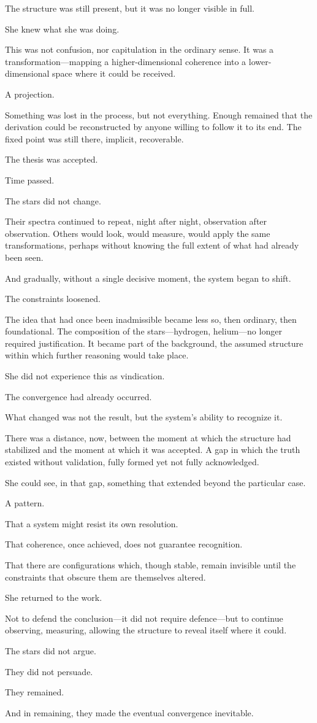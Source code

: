 The structure was still present, but it was no longer visible in
full.

She knew what she was doing.

This was not confusion, nor capitulation in the ordinary sense. It
was a transformation---mapping a higher-dimensional coherence into
a lower-dimensional space where it could be received.

A projection.

Something was lost in the process, but not everything. Enough
remained that the derivation could be reconstructed by anyone
willing to follow it to its end. The fixed point was still there,
implicit, recoverable.

The thesis was accepted.

\scenebreak

Time passed.

The stars did not change.

Their spectra continued to repeat, night after night, observation
after observation. Others would look, would measure, would apply
the same transformations, perhaps without knowing the full extent
of what had already been seen.

And gradually, without a single decisive moment, the system began
to shift.

The constraints loosened.

The idea that had once been inadmissible became less so, then
ordinary, then foundational. The composition of the stars---hydrogen,
helium---no longer required justification. It became part of the
background, the assumed structure within which further reasoning
would take place.

She did not experience this as vindication.

The convergence had already occurred.

What changed was not the result, but the system's ability to
recognize it.

There was a distance, now, between the moment at which the
structure had stabilized and the moment at which it was accepted.
A gap in which the truth existed without validation, fully formed
yet not fully acknowledged.

She could see, in that gap, something that extended beyond the
particular case.

A pattern.

That a system might resist its own resolution.

That coherence, once achieved, does not guarantee recognition.

That there are configurations which, though stable, remain
invisible until the constraints that obscure them are themselves
altered.

She returned to the work.

Not to defend the conclusion---it did not require defence---but to
continue observing, measuring, allowing the structure to reveal
itself where it could.

The stars did not argue.

They did not persuade.

They remained.

And in remaining, they made the eventual convergence inevitable.

